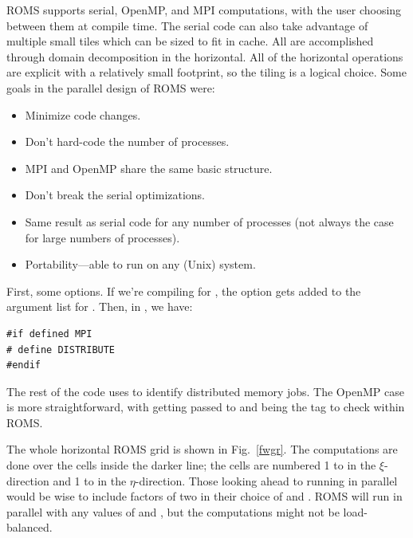 ROMS supports serial, OpenMP, and MPI computations, with the user
choosing between them at compile time. The serial code can also take
advantage of multiple small
tiles which can be sized to fit in cache. All are accomplished
through domain decomposition in the horizontal. All of the
horizontal operations are explicit with a relatively small
footprint, so the tiling is a logical choice. Some goals in the
parallel design of ROMS were:
\begin{itemize}
  \item Minimize code changes.
  \item Don't hard-code the number of processes.
  \item MPI and OpenMP share the same basic structure.
  \item Don't break the serial optimizations.
  \item Same result as serial code for any number of processes
  (not always the case for large numbers of processes).
  \item Portability---able to run on any (Unix) system.
\end{itemize}
First, some  options. If we're compiling for ,
the option  gets added to the argument list for
. Then, in , we have:
\begin{verbatim}
#if defined MPI
# define DISTRIBUTE
#endif
\end{verbatim}
The rest of the code uses  to identify distributed
memory jobs. The OpenMP case is more straightforward, with
 getting passed to  and 
being the tag to check within ROMS.

The whole horizontal ROMS grid is shown in Fig.\ \ref{fwgr}. The
computations are done over the cells inside the darker line;
the cells are numbered 1 to  in the $\xi$-direction and
1 to  in the $\eta$-direction. Those looking ahead to
running in parallel would be wise to include factors of two in
their choice of  and . ROMS will run in
parallel with any values of  and , but the computations
might not be load-balanced.


